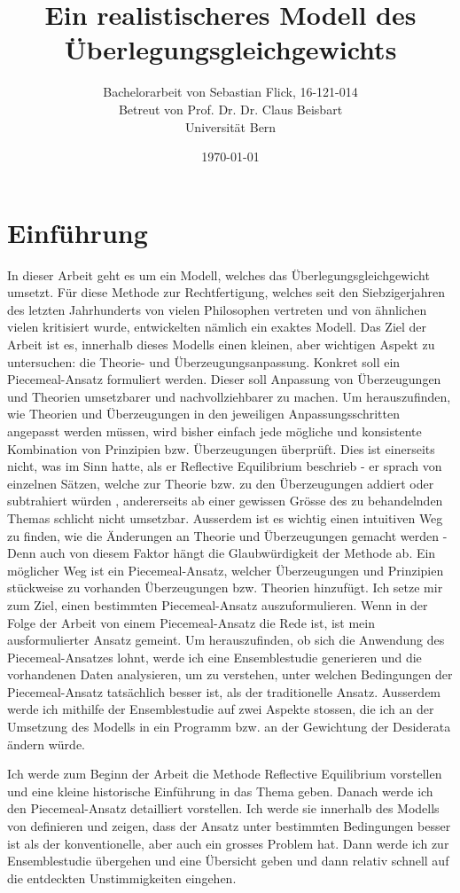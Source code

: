\documentclass{article}
\title{Ein realistischeres Modell des Überlegungsgleichgewichts}
\author{Bachelorarbeit von Sebastian Flick, 16-121-014\\Betreut von Prof. Dr. Dr. Claus Beisbart\\Universität Bern}
\date{\today}
\begin{document}
\maketitle
\section{Einführung}
In dieser Arbeit geht es um ein Modell, welches das Überlegungsgleichgewicht umsetzt. Für diese Methode zur Rechtfertigung, welches seit den Siebzigerjahren des letzten Jahrhunderts von vielen Philosophen vertreten und von ähnlichen vielen kritisiert wurde, entwickelten \citeauthor{beisbart_making_2021} nämlich ein exaktes Modell.
Das Ziel der Arbeit ist es, innerhalb dieses Modells einen kleinen, aber wichtigen Aspekt zu untersuchen: die Theorie- und Überzeugungsanpassung. Konkret soll ein Piecemeal-Ansatz formuliert werden. Dieser soll Anpassung von Überzeugungen und Theorien umsetzbarer und nachvollziehbarer zu machen. Um herauszufinden, wie Theorien und Überzeugungen in den jeweiligen Anpassungsschritten angepasst werden müssen, wird bisher einfach jede mögliche und konsistente Kombination von Prinzipien bzw. Überzeugungen überprüft. Dies ist einerseits nicht, was \citeauthor{goodman_fact_1983} im Sinn hatte, als er Reflective Equilibrium beschrieb - er sprach von einzelnen Sätzen, welche zur Theorie bzw. zu den Überzeugungen addiert oder subtrahiert würden \autocite{goodman_fact_1983}, andererseits ab einer gewissen Grösse des zu behandelnden Themas schlicht nicht umsetzbar. Ausserdem ist es wichtig einen intuitiven Weg zu finden, wie die Änderungen an Theorie und Überzeugungen gemacht werden - Denn auch von diesem Faktor hängt die Glaubwürdigkeit der Methode ab. Ein möglicher Weg ist ein Piecemeal-Ansatz, welcher Überzeugungen und Prinzipien stückweise zu vorhanden Überzeugungen bzw. Theorien hinzufügt. Ich setze mir zum Ziel, einen bestimmten Piecemeal-Ansatz auszuformulieren. Wenn in der Folge der Arbeit von einem Piecemeal-Ansatz die Rede ist, ist mein ausformulierter Ansatz gemeint. Um herauszufinden, ob sich die Anwendung des Piecemeal-Ansatzes lohnt, werde ich eine Ensemblestudie generieren und die vorhandenen Daten analysieren, um zu verstehen, unter welchen Bedingungen der Piecemeal-Ansatz tatsächlich besser ist, als der traditionelle Ansatz. Ausserdem werde ich mithilfe der Ensemblestudie auf zwei Aspekte stossen, die ich an der Umsetzung des Modells in ein Programm bzw. an der Gewichtung der Desiderata ändern würde.

Ich werde zum Beginn der Arbeit die Methode Reflective Equilibrium vorstellen und eine kleine historische Einführung in das Thema geben. Danach werde ich den Piecemeal-Ansatz detailliert vorstellen. Ich werde sie innerhalb des Modells von \citeauthor{beisbart_making_2021} definieren und zeigen, dass der Ansatz unter bestimmten Bedingungen besser ist als der konventionelle, aber auch ein grosses Problem hat. Dann werde ich zur Ensemblestudie übergehen und eine Übersicht geben und dann relativ schnell auf die entdeckten Unstimmigkeiten eingehen.
\end{document}
